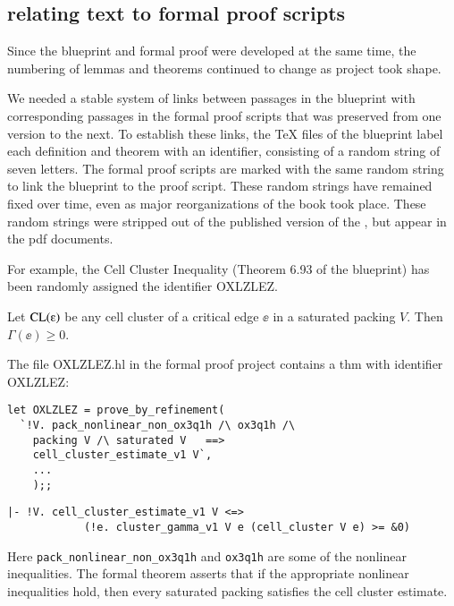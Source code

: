 \subsection{relating text to formal proof scripts}\label{sec:rt}

Since the blueprint and formal proof were developed at the same time, the 
numbering of lemmas and theorems continued to change as project 
took shape.

We needed a stable system of links between passages in the blueprint
with corresponding passages in the formal proof scripts that was
preserved from one version to the next.  To establish these links, the
TeX files of the blueprint label each definition and theorem with an
identifier, consisting of a random string of seven letters.  The
formal proof scripts are marked with the same random string to link
the blueprint to the proof script.  These random strings have remained
fixed over time, even as major reorganizations of the book took place.
These random strings were stripped out of the published version of the
\cite{DCG}, but appear in the pdf documents.

For example, the Cell Cluster Inequality (Theorem 6.93 of the
blueprint) has been randomly assigned the identifier OXLZLEZ.


\begin{theorem*} 
\label{lemma:cluster}
Let $\op{CL}(\ee)$ be any cell cluster of a critical edge $\ee$ in a
saturated packing $V$.  Then $\Gamma(\ee)\ge 0$.
\end{theorem*}


The file OXLZLEZ.hl in the formal proof project contains a thm with identifier
OXLZLEZ:

\begin{verbatim}
let OXLZLEZ = prove_by_refinement(
  `!V. pack_nonlinear_non_ox3q1h /\ ox3q1h /\ 
    packing V /\ saturated V   ==>
    cell_cluster_estimate_v1 V`,
    ...
    );;
\end{verbatim}


\begin{verbatim}
|- !V. cell_cluster_estimate_v1 V <=>
            (!e. cluster_gamma_v1 V e (cell_cluster V e) >= &0)
\end{verbatim}

Here \verb!pack_nonlinear_non_ox3q1h! and \verb!ox3q1h! are some of the
nonlinear inequalities.   The formal theorem asserts that if the appropriate nonlinear inequalities
hold, then every saturated packing satisfies the cell cluster estimate.

